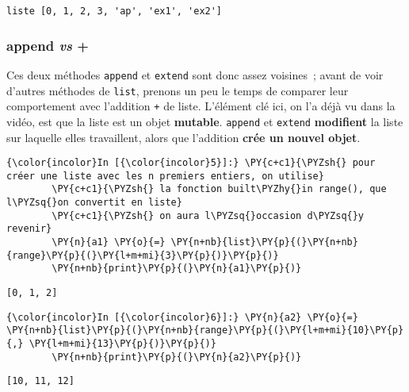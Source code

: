     \begin{Verbatim}[commandchars=\\\{\}]
liste [0, 1, 2, 3, 'ap', 'ex1', 'ex2']

    \end{Verbatim}

    \hypertarget{append-vs}{%
\subsubsection{\texorpdfstring{\textbf{append} \emph{vs}
\textbf{+}}{append vs +}}\label{append-vs}}

    Ces deux méthodes \texttt{append} et \texttt{extend} sont donc assez
voisines~; avant de voir d'autres méthodes de \texttt{list}, prenons un
peu le temps de comparer leur comportement avec l'addition \texttt{+} de
liste. L'élément clé ici, on l'a déjà vu dans la vidéo, est que la liste
est un objet \textbf{mutable}. \texttt{append} et \texttt{extend}
\textbf{modifient} la liste sur laquelle elles travaillent, alors que
l'addition \textbf{crée un nouvel objet}.

    \begin{Verbatim}[commandchars=\\\{\}]
{\color{incolor}In [{\color{incolor}5}]:} \PY{c+c1}{\PYZsh{} pour créer une liste avec les n premiers entiers, on utilise}
        \PY{c+c1}{\PYZsh{} la fonction built\PYZhy{}in range(), que l\PYZsq{}on convertit en liste}
        \PY{c+c1}{\PYZsh{} on aura l\PYZsq{}occasion d\PYZsq{}y revenir}
        \PY{n}{a1} \PY{o}{=} \PY{n+nb}{list}\PY{p}{(}\PY{n+nb}{range}\PY{p}{(}\PY{l+m+mi}{3}\PY{p}{)}\PY{p}{)}
        \PY{n+nb}{print}\PY{p}{(}\PY{n}{a1}\PY{p}{)}
\end{Verbatim}


    \begin{Verbatim}[commandchars=\\\{\}]
[0, 1, 2]

    \end{Verbatim}

    \begin{Verbatim}[commandchars=\\\{\}]
{\color{incolor}In [{\color{incolor}6}]:} \PY{n}{a2} \PY{o}{=} \PY{n+nb}{list}\PY{p}{(}\PY{n+nb}{range}\PY{p}{(}\PY{l+m+mi}{10}\PY{p}{,} \PY{l+m+mi}{13}\PY{p}{)}\PY{p}{)}
        \PY{n+nb}{print}\PY{p}{(}\PY{n}{a2}\PY{p}{)}
\end{Verbatim}


    \begin{Verbatim}[commandchars=\\\{\}]
[10, 11, 12]

    \end{Verbatim}

